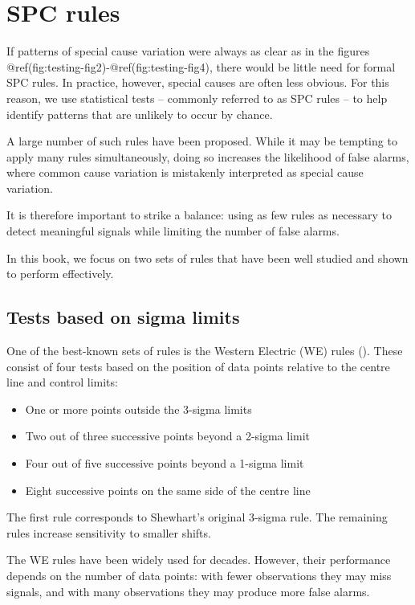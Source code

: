 \documentclass[
]{book}
\providecommand{\tightlist}{%
  \setlength{\itemsep}{0pt}\setlength{\parskip}{0pt}}
\begin{document}
\section{SPC rules}\label{spc-rules}

If patterns of special cause variation were always as clear as in the
figures @ref(fig:testing-fig2)-@ref(fig:testing-fig4), there would be
little need for formal SPC rules. In practice, however, special causes
are often less obvious. For this reason, we use statistical tests --
commonly referred to as SPC rules -- to help identify patterns that are
unlikely to occur by chance.

A large number of such rules have been proposed. While it may be
tempting to apply many rules simultaneously, doing so increases the
likelihood of false alarms, where common cause variation is mistakenly
interpreted as special cause variation.

It is therefore important to strike a balance: using as few rules as
necessary to detect meaningful signals while limiting the number of
false alarms.

In this book, we focus on two sets of rules that have been well studied
and shown to perform effectively.

\subsection{Tests based on sigma
limits}\label{tests-based-on-sigma-limits}

One of the best-known sets of rules is the Western Electric (WE) rules
(). These consist of
four tests based on the position of data points relative to the centre
line and control limits:

\begin{itemize}
\tightlist
\item
  One or more points outside the 3-sigma limits
\item
  Two out of three successive points beyond a 2-sigma limit
\item
  Four out of five successive points beyond a 1-sigma limit
\item
  Eight successive points on the same side of the centre line
\end{itemize}

The first rule corresponds to Shewhart's original 3-sigma rule. The
remaining rules increase sensitivity to smaller shifts.

The WE rules have been widely used for decades. However, their
performance depends on the number of data points: with fewer
observations they may miss signals, and with many observations they may
produce more false alarms.
\end{document}
